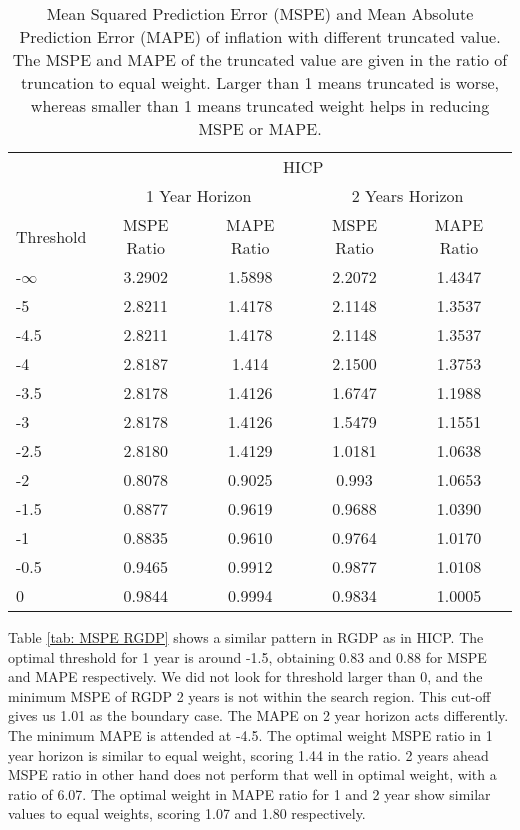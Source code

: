 \documentclass[11pt]{article}
\begin{document}
\begin{table}[!h]
	\centering
	\caption{Mean Squared Prediction Error (MSPE) and Mean Absolute Prediction Error (MAPE) of inflation with different truncated value. The MSPE and MAPE of the truncated value are given in the ratio of truncation to equal weight. Larger than 1 means truncated is worse, whereas smaller than 1 means truncated weight helps in reducing MSPE or MAPE.}
	\label{tab: MSPE HICP}
	\begin{tabular}{lcccc}
		\hline
		&                        \multicolumn{4}{c}{HICP}                         \\
		\cmidrule(lr){2-5}                              & \multicolumn{2}{c}{1 Year Horizon} & \multicolumn{2}{c}{2 Years Horizon} \\
		\cmidrule(lr){2-3} \cmidrule(lr){4-5}
		Threshold & MSPE Ratio &    MAPE Ratio    & MSPE Ratio &    MAPE Ratio    \\ \hline
-$\infty$ & 3.2902 & 1.5898 & 2.2072 & 1.4347\\ 
-5 & 2.8211 & 1.4178 & 2.1148 & 1.3537\\ 
-4.5 & 2.8211 & 1.4178 & 2.1148 & 1.3537\\ 
-4 & 2.8187 & 1.414 & 2.1500 & 1.3753\\ 
-3.5 & 2.8178 & 1.4126 & 1.6747 & 1.1988\\ 
-3 & 2.8178 & 1.4126 & 1.5479 & 1.1551\\ 
-2.5 & 2.8180 & 1.4129 & 1.0181 & 1.0638\\ 
-2 & 0.8078 & 0.9025 & 0.993 & 1.0653\\ 
-1.5 & 0.8877 & 0.9619 & 0.9688 & 1.0390\\ 
-1 & 0.8835 & 0.9610 & 0.9764 & 1.0170\\ 
-0.5 & 0.9465 & 0.9912 & 0.9877 & 1.0108\\ 
0 & 0.9844 & 0.9994 & 0.9834 & 1.0005\\ 		 \hline
	\end{tabular}
\end{table}

Table \ref{tab: MSPE RGDP} shows a similar pattern in RGDP as in HICP. The optimal threshold for 1 year is around -1.5, obtaining 0.83 and 0.88 for MSPE and MAPE respectively. We did not look for threshold larger than 0, and the minimum MSPE of RGDP 2 years is not within the search region. This cut-off gives us 1.01 as the boundary case. The MAPE on 2 year horizon acts differently. The minimum MAPE is attended at -4.5. The optimal weight MSPE ratio in 1 year horizon is similar to equal weight, scoring 1.44 in the ratio. 2 years ahead MSPE ratio in other hand does not perform that well in optimal weight, with a ratio of 6.07. The optimal weight in MAPE ratio for 1 and 2 year show similar values to equal weights, scoring 1.07 and 1.80 respectively.
\end{document}
